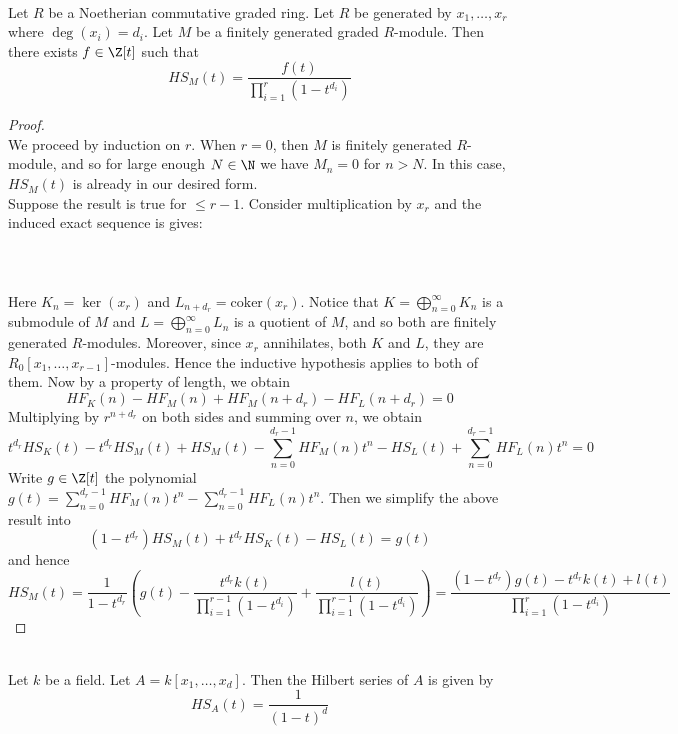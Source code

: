\documentclass[a4paper]{article}
\begin{document}
\begin{prp}{}{}\\ Let $R$ be a Noetherian commutative graded ring. Let $R$ be generated by $x_1,\dots,x_r$ where $\deg(x_i)=d_i$. Let $M$ be a finitely generated graded $R$-module. Then there exists $f\in\Z[t]$ such that $$HS_M(t)=\frac{f(t)}{\prod_{i=1}^r(1-t^{d_i})}$$
\begin{proof}\\
We proceed by induction on $r$. When $r=0$, then $M$ is finitely generated $R$-module, and so for large enough $N\in\N$ we have $M_n=0$ for $n>N$. In this case, $HS_M(t)$ is already in our desired form. \\

Suppose the result is true for $\leq r-1$. Consider multiplication by $x_r$ and the induced exact sequence is gives: \\~\\
 \\~\\
Here $K_n=\ker(x_r)$ and $L_{n+d_r}=\text{coker}(x_r)$. Notice that $K=\bigoplus_{n=0}^\infty K_n$ is a submodule of $M$ and $L=\bigoplus_{n=0}^\infty L_n$ is a quotient of $M$, and so both are finitely generated $R$-modules. Moreover, since $x_r$ annihilates, both $K$ and $L$, they are $R_0[x_1,\dots,x_{r-1}]$-modules. Hence the inductive hypothesis applies to both of them. Now by a property of length, we obtain $$HF_K(n)-HF_M(n)+HF_M(n+d_r)-HF_L(n+d_r)=0$$ Multiplying by $r^{n+d_r}$ on both sides and summing over $n$, we obtain $$t^{d_r}HS_K(t)-t^{d_r}HS_M(t)+HS_M(t)-\sum_{n=0}^{d_r-1}HF_M(n)t^n-HS_L(t)+\sum_{n=0}^{d_r-1}HF_L(n)t^n=0$$ Write $g\in\Z[t]$ the polynomial $g(t)=\sum_{n=0}^{d_r-1}HF_M(n)t^n-\sum_{n=0}^{d_r-1}HF_L(n)t^n$. Then we simplify the above result into $$(1-t^{d_r})HS_M(t)+t^{d_r}HS_K(t)-HS_L(t)=g(t)$$ and hence $$HS_M(t)=\frac{1}{1-t^{d_r}}\left(g(t)-\frac{t^{d_r}k(t)}{\prod_{i=1}^{r-1}(1-t^{d_i})}+\frac{l(t)}{\prod_{i=1}^{r-1}(1-t^{d_i})}\right)=\frac{(1-t^{d_r})g(t)-t^{d_r}k(t)+l(t)}{\prod_{i=1}^r(1-t^{d_i})}$$
\end{proof}
\end{prp}

\begin{eg}{}{}\\
Let $k$ be a field. Let $A=k[x_1,\dots,x_d]$. Then the Hilbert series of $A$ is given by $$HS_A(t)=\frac{1}{(1-t)^d}$$
\end{eg}
\end{document}
